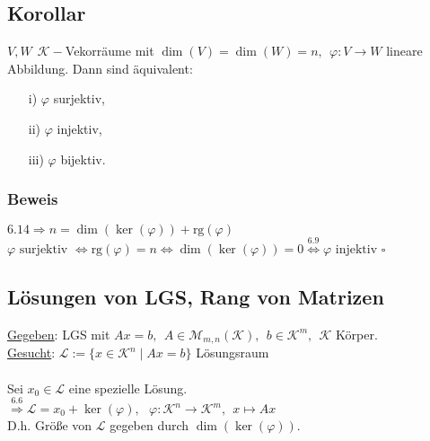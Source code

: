\documentclass[a4paper, 12pt,titlepage, pdf, headsepline]{article}
\newcommand{\K}{\mathcal{K}}
\newcommand{\M}{\mathcal{M}}
\newcommand{\uline}[1]{\underline{#1}}
\newcommand{\rg}{\textrm{rg}}
\newcommand{\qed}{\hfill$\square$}
\renewcommand{\>}{\rightarrow}
\renewcommand{\*}{\cdot}
\renewcommand{\phi}{\varphi}
\begin{document}
		      			\subsection{Korollar}
		      			\label{6.15}
		      			$V,W ~~\K-$Vekorräume mit $\dim(V) = \dim(W) = n, ~~\phi: V \rightarrow W$ lineare Abbildung. Dann sind äquivalent:
		      			\begin{itemize}
		      				\item[i)] $\phi$ surjektiv,
		      				\item[ii)] $\phi$ injektiv,
		      				\item[iii)] $\phi$ bijektiv.
		      			\end{itemize}
		      			\subsubsection*{Beweis}
                                        $\hyperref[6.14]{6.14} \Rightarrow n = \dim(\ker(\phi)) + \rg(\phi)$\\
                                        $\phi \textrm{ surjektiv } \Leftrightarrow \rg(\phi) = n \Leftrightarrow \dim(\ker(\phi)) = 0\overset{\hyperref[6.9]{6.9}}{\Leftrightarrow} \phi \textrm{ injektiv}$ \qed
		      			\subsection*{Lösungen von LGS, Rang von Matrizen}
		      			\uline{Gegeben}: LGS mit $Ax = b, ~~A \in \M_{m,n}(\K),~~ b \in \K^m, ~~\K$ Körper.\\
		      			\uline{Gesucht}: $\mathcal{L} := \{x \in \K^n \mid Ax = b \}$ Lösungsraum\\
		      			\\
		      			Sei $x_0 \in \mathcal{L}$ eine spezielle Lösung.\\
                                        \noindent\hspace*{12mm}$\overset{\hyperref[6.6]{6.6}}{\Rightarrow} \mathcal{L} = x_0 + \ker(\phi), ~~~\phi: \K^n \rightarrow \K^m,~~ x \mapsto Ax$\\
                                        D.h. Größe von $\mathcal{L}$ gegeben durch $\dim(\ker(\phi))$.
\end{document}
